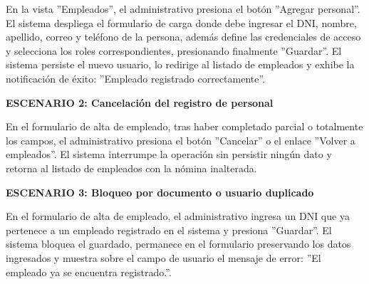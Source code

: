 \documentclass[a4paper,9pt]{article}
\begin{document}
\begin{tcolorbox}[hucard, title={\textbf{HU-7: AGREGAR PERSONAL} \hfill \scriptsize \colorbox{bluestatus}{\textbf{\ New\ }} \quad \colorbox{white}{\textcolor{primarydark}{\textbf{\ 2 pts\ }}}}]
{En la vista ''Empleados'', el administrativo presiona el botón ''Agregar personal''. El sistema despliega el formulario de carga donde debe ingresar el DNI, nombre, apellido, correo y teléfono de la persona, además define las credenciales de acceso y selecciona los roles correspondientes, presionando finalmente ''Guardar''. El sistema persiste el nuevo usuario, lo redirige al listado de empleados y exhibe la notificación de éxito: ''Empleado registrado correctamente''.\par\vspace{2.5pt}
\noindent\textbf{\textcolor{secondarydark}{ESCENARIO 2:  Cancelación del registro de personal}}\par\vspace{1pt}
En el formulario de alta de empleado, tras haber completado parcial o totalmente los campos, el administrativo presiona el botón ''Cancelar'' o el enlace ''Volver a empleados''. El sistema interrumpe la operación sin persistir ningún dato y retorna al listado de empleados con la nómina inalterada.\par\vspace{2.5pt}
\noindent\textbf{\textcolor{secondarydark}{ESCENARIO 3:  Bloqueo por documento o usuario duplicado}}\par\vspace{1pt}
En el formulario de alta de empleado, el administrativo ingresa un DNI que ya pertenece a un empleado registrado en el sistema y presiona ''Guardar''. El sistema bloquea el guardado, permanece en el formulario preservando los datos ingresados y muestra sobre el campo de usuario el mensaje de error: ''El empleado ya se encuentra registrado.''.\par\vspace{2.5pt}
}\par
\end{tcolorbox}
\end{document}
